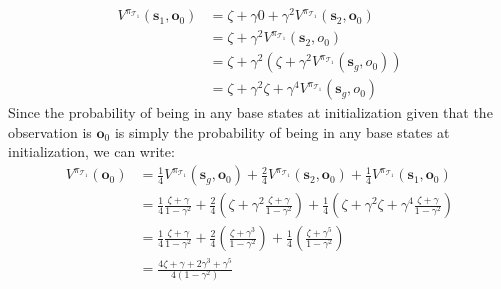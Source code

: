     \begin{align*}
        V^{\pi_{\mathcal{T}_1}} (\boldsymbol{s}_1, \boldsymbol{o}_0) &= \zeta + \gamma 0 + \gamma^2 V^{\pi_{\mathcal{T}_1}} (\boldsymbol{s}_2, \boldsymbol{o}_0) \\
        &= \zeta + \gamma^2 V^{\pi_{\mathcal{T}_1}} (\boldsymbol{s}_2, o_0) \\
        &= \zeta + \gamma^2 (\zeta + \gamma^2 V^{\pi_{\mathcal{T}_1}} (\boldsymbol{s}_g, o_0)) \\
        &= \zeta + \gamma^2 \zeta + \gamma^4 V^{\pi_{\mathcal{T}_1}} (\boldsymbol{s}_g, o_0)
    \end{align*}
    Since the probability of being in any base states at initialization given that the observation is $\boldsymbol{o}_0$ is simply the probability of being in any base states at initialization, we can write:
    \begin{align*}
        V^{\pi_{\mathcal{T}_1}} (\boldsymbol{o}_0) &= \frac{1}{4} V^{\pi_{\mathcal{T}_1}} (\boldsymbol{s}_g, \boldsymbol{o}_0) + \frac{2}{4} V^{\pi_{\mathcal{T}_1}} (\boldsymbol{s}_2, \boldsymbol{o}_0) + \frac{1}{4} V^{\pi_{\mathcal{T}_1}} (\boldsymbol{s}_1, \boldsymbol{o}_0) \\
        &= \frac{1}{4} \frac{\zeta + \gamma}{1 - \gamma^2} + \frac{2}{4} (\zeta + \gamma^2 \frac{\zeta + \gamma}{1 - \gamma^2}) + \frac{1}{4} (\zeta + \gamma^2 \zeta + \gamma^4 \frac{\zeta + \gamma}{1 - \gamma^2}) \\
        &= \frac{1}{4} \frac{\zeta + \gamma}{1 - \gamma^2} + \frac{2}{4} (\frac{\zeta + \gamma ^ 3}{1-\gamma^2}) + \frac{1}{4}(\frac{\zeta+\gamma^5}{1-\gamma^2}) \\
        &= \frac{4\zeta + \gamma + 2\gamma^3 + \gamma^5}{4(1-\gamma^2)}
    \end{align*}

